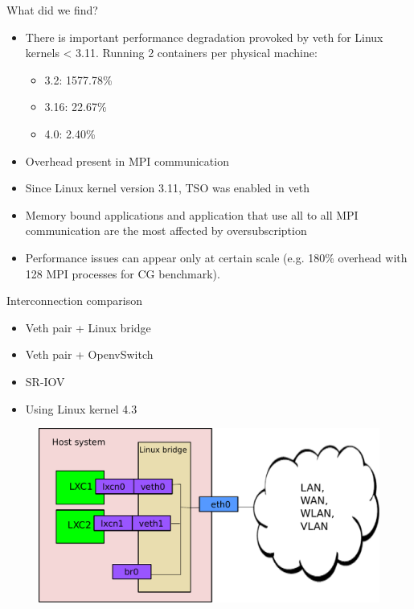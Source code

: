 \documentclass[11pt,xcolor=dvipsnames,presentation]{beamer}
\begin{document}
\begin{frame}[label=sec-4-0-6]{What did we find?}
\begin{itemize}
\item There is important performance degradation provoked by veth for
Linux kernels < 3.11. Running 2 containers per physical machine:
\begin{itemize}
\item 3.2: \alert{1577.78\%}
\item 3.16: \alert{22.67\%}
\item 4.0: \alert{2.40\%}
\end{itemize}
\item Overhead present in MPI communication
\item Since Linux kernel version \alert{3.11}, \alert{TSO} was enabled in \alert{veth}
\item Memory bound applications and application that use all to all MPI communication
are the most affected by oversubscription
\item Performance issues can appear only at certain scale (e.g. \alert{180\%} overhead with 128 MPI processes for CG benchmark).
\end{itemize}
\end{frame}


\begin{frame}[label=sec-4-0-7]{Interconnection comparison}
\begin{itemize}
\item \alert{Veth pair + Linux bridge}
\item \alert{Veth pair + OpenvSwitch}
\item \alert{SR-IOV}
\item Using Linux kernel 4.3
\end{itemize}

\begin{figure}[!h]
  \center
  \includegraphics[scale=0.4]{figures/lxc-veth.pdf}
  \label{fig:hpc}
\end{figure}
\end{frame}
\end{document}
